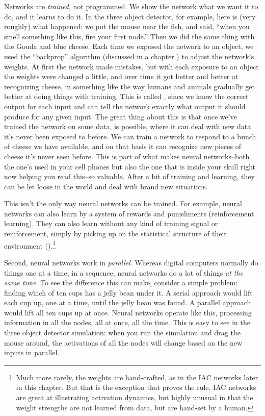 Networks are \emph{trained}, not programmed. We show the network what we want it to do, and it learns to do it. In the three object detector, for example, here is (very roughly) what happened: we put the mouse near the fish, and said, ``when you smell something like this, fire your first node.''  Then we did the same thing with the Gouda and blue cheese. Each time we exposed the network to an object, we used the ``backprop'' algorithm (discussed in a chapter ) to adjust the network's weights. At first the network made mistakes, but with each exposure to an object the weights were changed a little, and over time it got better and better at recognizing cheese, in something like the way humans and animals gradually get better at doing things with training. This is called , since we know the correct output for each input and can tell the network exactly what output it should produce for any given input.  The great thing about this is that once we've trained the network on some data,  is possible, where it can deal with new data it's never been exposed to before. We can train a network to respond to a bunch of cheese we have available, and on that basis it can recognize new pieces of cheese it's never seen before. This is part of what makes neural networks--both the one's used in your cell phones but also the one that is inside your skull right now helping you read this--so valuable. After a bit of training and learning, they can be let loose in the world and deal with brand new situations.

This isn't the only way neural networks can be trained. For example, neural networks can also learn by a system of rewards and punishments (reinforcement learning). They can also learn without any kind of training signal or reinforcement, simply by picking up on the statistical structure of their environment ().\footnote{Much more rarely, the weights are hand-crafted, as in the IAC networks later in this chapter. But that is the exception that proves the rule. IAC networks are great at illustrating activation dynamics, but highly unusual in that the weight strengths are not learned from data, but are hand-set by a human.}

Second, neural networks work in \emph{parallel}. Whereas digital computers normally do things one at a time, in a sequence, neural networks do a lot of things  \emph{at the same time}. To see the difference this can make, consider a simple problem: finding which of ten cups has a jelly bean under it. A serial approach would lift each cup up, one at a time, until the jelly bean was found. A parallel approach would lift all ten cups up at once. Neural networks operate like this, processing information in all the nodes, all at once, all the time. This is easy to see  in the three object detector simulation: when you run the simulation and drag the mouse around, the activations of all the nodes will change based on the new inputs in parallel. 

